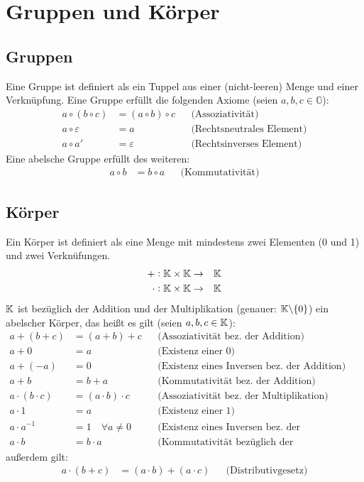 \section{Gruppen und Körper}
\subsection{Gruppen}
Eine Gruppe ist definiert als ein Tuppel aus einer (nicht-leeren) Menge
und einer Verknüpfung.
Eine Gruppe erfüllt die folgenden Axiome (seien $a,b,c \in \mathbb{G}$):
\begin{align*}
    a \circ (b \circ c) &= (a \circ b) \circ c &&\text{(Assoziativität)}\\
    a \circ \varepsilon &= a &&\text{(Rechtsneutrales Element)}\\
    a \circ a' &= \varepsilon  &&\text{(Rechtsinverses Element)}
\end{align*}
Eine abelsche Gruppe erfüllt des weiteren:
\begin{align*}
    a \circ b &= b \circ a  &&\text{(Kommutativität)}
\end{align*}

\subsection{Körper}
Ein Körper ist definiert als eine Menge mit mindestens zwei Elementen
(0 und 1) und zwei Verknüfungen.
\begin{eqnarray*}
    +: \mathbb{K} \times \mathbb{K} &\rightarrow& \mathbb{K} \\
    \cdot: \mathbb{K} \times \mathbb{K} &\rightarrow& \mathbb{K}
\end{eqnarray*}
$\mathbb{K}$ ist bezüglich der Addition und der Multiplikation (genauer: $\mathbb{K} \backslash \{0\}$) ein abelscher
Körper, das heißt es gilt (seien $a,b,c \in \mathbb{K}$):
\begin{align*}
    a + (b + c) &= (a + b) + c &&\text{(Assoziativität bez.\ der Addition)}\\
    a + 0 &= a &&\text{(Existenz einer 0)}\\
    a + (-a) &= 0 &&\text{(Existenz eines Inversen bez.\ der Addition)}\\
    a + b &= b + a &&\text{(Kommutativität bez.\ der Addition)}\\
    a \cdot (b \cdot c) &= (a \cdot b) \cdot c &&\text{(Assoziativität bez.\ der Multiplikation)}\\
    a \cdot 1 &= a &&\text{(Existenz einer 1)}\\
    a \cdot a^{-1} &= 1\quad \forall a \neq 0 &&\text{(Existenz eines Inversen bez.\ der Multiplikation)}\\
    a \cdot b &= b \cdot a &&\text{(Kommutativität bezüglich der Multiplikation)}
\end{align*}
außerdem gilt:
\begin{align*}
    a \cdot (b + c) &= (a \cdot b) + (a \cdot c) &&\text{(Distributivgesetz)}
\end{align*}
